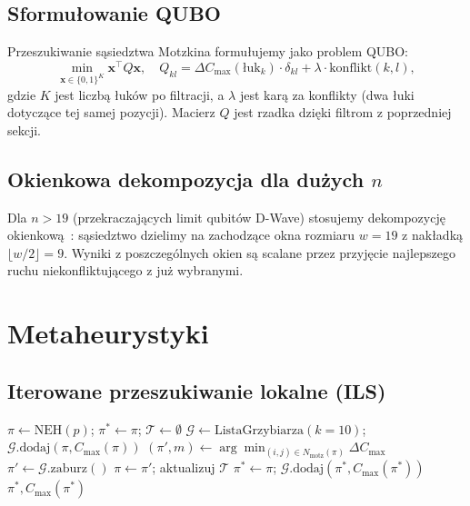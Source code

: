 \documentclass[12pt,a4paper]{article}
\begin{document}
\subsection{Sformułowanie QUBO}

Przeszukiwanie sąsiedztwa Motzkina formułujemy jako problem QUBO:
\[
\min_{\mathbf{x} \in \{0,1\}^K} \mathbf{x}^\top Q \mathbf{x},\quad Q_{kl} = \Delta C_{\max}(\text{łuk}_k) \cdot \delta_{kl} + \lambda \cdot \text{konflikt}(k,l),
\]
gdzie $K$ jest liczbą łuków po filtracji, a $\lambda$ jest karą za konflikty (dwa łuki dotyczące tej samej pozycji). Macierz $Q$ jest rzadka dzięki filtrom z poprzedniej sekcji.

\subsection{Okienkowa dekompozycja dla dużych $n$}

Dla $n > 19$ (przekraczających limit qubitów D-Wave) stosujemy dekompozycję okienkową~\cite{windowed_qubo}: sąsiedztwo dzielimy na zachodzące okna rozmiaru $w = 19$ z nakładką $\lfloor w/2 \rfloor = 9$. Wyniki z poszczególnych okien są scalane przez przyjęcie najlepszego ruchu niekonfliktującego z już wybranymi.

\section{Metaheurystyki}

\subsection{Iterowane przeszukiwanie lokalne (ILS)}

\begin{algorithm}[h]
\caption{ILS z listą grzybiarza}
\begin{algorithmic}[1]
\State $\pi \gets \text{NEH}(p)$; $\pi^* \gets \pi$; $\mathcal{T} \gets \emptyset$
\State $\mathcal{G} \gets \text{ListaGrzybiarza}(k=10)$; $\mathcal{G}.\text{dodaj}(\pi, C_{\max}(\pi))$
  \State $(\pi', m) \gets \arg\min_{(i,j) \in N_{\mathrm{motz}}(\pi)} \Delta C_{\max}$
    \State $\pi' \gets \mathcal{G}.\text{zaburz}()$ 
  \EndIf
  \State $\pi \gets \pi'$; aktualizuj $\mathcal{T}$
    \State $\pi^* \gets \pi$; $\mathcal{G}.\text{dodaj}(\pi^*, C_{\max}(\pi^*))$
  \EndIf
\EndWhile
\Return $\pi^*, C_{\max}(\pi^*)$
\end{algorithmic}
\end{algorithm}
\end{document}
